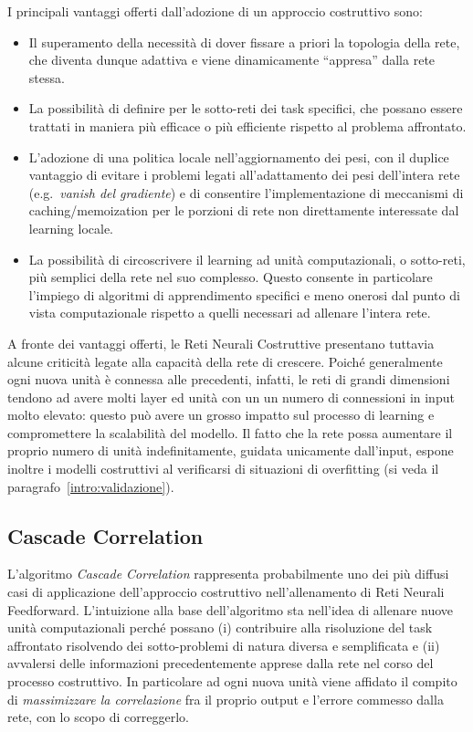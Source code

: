 I principali vantaggi offerti dall'adozione di un approccio costruttivo sono:
\begin{itemize}
\item Il superamento della necessità di dover fissare a priori la topologia della rete, che diventa dunque adattiva e viene dinamicamente ``appresa'' dalla rete stessa.
\item La possibilità di definire per le sotto-reti dei task specifici, che possano essere trattati in maniera più efficace o più efficiente rispetto al problema affrontato.
\item L'adozione di una politica locale nell'aggiornamento dei pesi, con il duplice vantaggio di evitare i problemi legati all'adattamento dei pesi dell'intera rete (e.g.\ \emph{vanish del gradiente}) e di consentire l'implementazione di meccanismi di caching/memoization per le porzioni di rete non direttamente interessate dal learning locale.
\item La possibilità di circoscrivere il learning ad unità computazionali, o sotto-reti, più semplici della rete nel suo complesso. Questo consente in particolare l'impiego di algoritmi di apprendimento specifici e meno onerosi dal punto di vista computazionale rispetto a quelli necessari ad allenare l'intera rete.
\end{itemize}

A fronte dei vantaggi offerti, le Reti Neurali Costruttive presentano tuttavia alcune criticità legate alla capacità della rete di crescere. Poiché generalmente ogni nuova unità è connessa alle precedenti, infatti, le reti di grandi dimensioni tendono ad avere molti layer ed unità con un un numero di connessioni in input molto elevato: questo può avere un grosso impatto sul processo di learning e compromettere la scalabilità del modello. Il fatto che la rete possa aumentare il proprio numero di unità indefinitamente, guidata unicamente dall'input, espone inoltre i modelli costruttivi al verificarsi di situazioni di overfitting (si veda il paragrafo~\ref{intro:validazione}).




\subsection{Cascade Correlation}\label{sec:intro:cnn:ccorr}

L'algoritmo \emph{Cascade Correlation} \cite{Fahlman:CC, Littmann:learningAndGeneralization, Prechelt:InvestigationOfTheCasCor} rappresenta probabilmente uno dei più diffusi casi di applicazione dell'approccio costruttivo nell'allenamento di Reti Neurali Feedforward. L'intuizione alla base dell'algoritmo sta nell'idea di allenare nuove unità computazionali perché possano (i) contribuire alla risoluzione del task affrontato risolvendo dei sotto-problemi di natura diversa e semplificata e (ii) avvalersi delle informazioni precedentemente apprese dalla rete nel corso del processo costruttivo. In particolare ad ogni nuova unità viene affidato il compito di \emph{massimizzare la correlazione} fra il proprio output e l'errore commesso dalla rete, con lo scopo di correggerlo.

